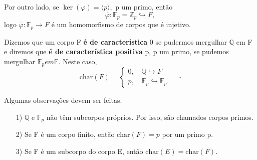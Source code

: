 \documentclass[AlgebraII/algebraII_notes.tex]{subfiles}
\begin{document}
Por outro lado, se \(\ker{(\varphi )} = \langle p \rangle,\) p um primo, então
\[
	\overline{\varphi }:\mathbb{F}_{p}=\mathbb{Z}_{p}\hookrightarrow F,
\]
logo \(\overline{\varphi }:\mathbb{F}_{p}\rightarrow F\) é um homomorfismo de corpos que é injetivo.
\begin{def*}
	Dizemos que um corpo F \textbf{é de característica} 0 se pudermos mergulhar \(\mathbb{Q}\) em F e diremos que \textbf{é de característica positiva} p, p
	um primo, se pudemos mergulhar \(\mathbb{F}_{p} em \mathbb{F}.\) Neste caso,
	\[
		\mathrm{char}{(F)} = \left\{\begin{array}{ll}
			0,\quad \mathbb{Q}\hookrightarrow F \\
			p,\quad \mathbb{F}_{p}\hookrightarrow \mathbb{F}_{p}.
		\end{array}\right.\quad\square
	\]
\end{def*}
Algumas observações devem ser feitas.
\begin{itemize}
	\item[1)] \(\mathbb{Q}\) e \(\mathbb{F}_{p}\) não têm subcorpos próprios. Por isso, são chamados corpos primos.
	\item[2)] Se F é um corpo finito, então \(\mathrm{char}(F) = p\) por um primo p.
	\item[3)] Se F é um subcorpo do corpo E, então \(\mathrm{char}(E) = \mathrm{char}(F).\)
\end{itemize}
\end{document}
